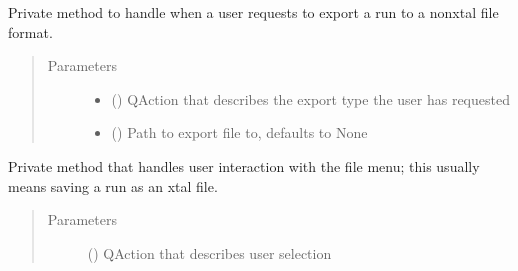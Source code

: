 \documentclass[letterpaper,10pt,english]{sphinxmanual}
\begin{document}
\begin{fulllineitems}
\begin{fulllineitems}
\label{\detokenize{polo.windows:polo.windows.main_window.MainWindow._handle_export}}
Private method to handle when a user requests to export a run
to a non\sphinxhyphen{}xtal file format.
\begin{quote}\begin{description}
\item[{Parameters}] \leavevmode\begin{itemize}
\item {} 
 () \textendash{} QAction that describes the export type the user has requested

\item {} 
 (\sphinxstyleliteralemphasis{\sphinxupquote{, }}) \textendash{} Path to export file to, defaults to None

\end{itemize}

\end{description}\end{quote}

\end{fulllineitems}


\begin{fulllineitems}
\label{\detokenize{polo.windows:polo.windows.main_window.MainWindow._handle_file_menu}}
Private method that handles user interaction with the file menu;
this usually means saving a run as an xtal file.
\begin{quote}\begin{description}
\item[{Parameters}] \leavevmode
{} () \textendash{} QAction that describes user selection


\end{description}
\end{quote}
\end{fulllineitems}
\end{fulllineitems}
\end{document}
